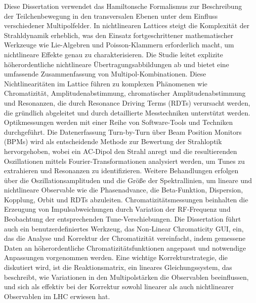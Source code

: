 {%
Diese Dissertation verwendet das Hamiltonsche Formalismus zur Beschreibung der Teilchenbewegung in
den transversalen Ebenen unter dem Einfluss verschiedener Multipolfelder. In nichtlinearen Lattices
steigt die Komplexität der Strahldynamik erheblich, was den Einsatz fortgeschrittener mathematischer
Werkzeuge wie Lie-Algebren und Poisson-Klammern erforderlich macht, um nichtlineare Effekte genau zu
charakterisieren. Die Studie leitet explizite höherordentliche nichtlineare Übertragungsabbildungen
ab und bietet eine umfassende Zusammenfassung von Multipol-Kombinationen. Diese Nichtlinearitäten im
Lattice führen zu komplexen Phänomenen wie Chromatizität, Amplitudenabstimmung, chromatischer
Amplitudenabstimmung und Resonanzen, die durch Resonance Driving Terms (RDTs) verursacht werden, die
gründlich abgeleitet und durch detaillierte Messtechniken unterstützt werden.\\
\indent
Optikmessungen werden mit einer Reihe von Software-Tools und Techniken durchgeführt. Die
Datenerfassung Turn-by-Turn über Beam Position Monitors (BPMs) wird als entscheidende Methode zur
Bewertung der Strahloptik hervorgehoben, wobei ein AC-Dipol den Strahl anregt und die resultierenden
Oszillationen mittels Fourier-Transformationen analysiert werden, um Tunes zu extrahieren und
Resonanzen zu identifizieren. Weitere Behandlungen erfolgen über die Oszillationsamplituden und die
Größe der Spektrallinien, um lineare und nichtlineare Observable wie die Phasenadvance, die
Beta-Funktion, Dispersion, Kopplung, Orbit und RDTs abzuleiten. Chromatizitätsmessungen beinhalten
die Erzeugung von Impulsabweichungen durch Variation der RF-Frequenz und Beobachtung der
entsprechenden Tune-Verschiebungen. Die Dissertation führt auch ein benutzerdefiniertes Werkzeug,
das Non-Linear Chromaticity GUI, ein, das die Analyse und Korrektur der Chromatizität vereinfacht,
indem gemessene Daten an höherordentliche Chromatizitätsfunktionen angepasst und notwendige
Anpassungen vorgenommen werden. Eine wichtige Korrekturstrategie, die diskutiert wird, ist die
Reaktionsmatrix, ein lineares Gleichungssystem, das beschreibt, wie Variationen in den
Multipolstärken die Observablen beeinflussen, und sich als effektiv bei der Korrektur sowohl
linearer als auch nichtlinearer Observablen im LHC erwiesen hat.

}
